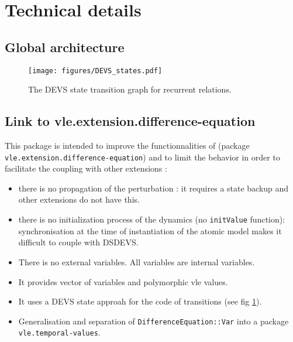 \documentclass{article}
\theoremstyle{remark}
\begin{document}
\section{Technical details}

\subsection{Global architecture}
\label{sec:archi}

\begin{figure}[!h]
\begin{center} 
\texttt{[image: figures/DEVS\_states.pdf]}
\caption{\label{fig:DEVSgraph} The DEVS state transition graph 
for recurrent relations.}
\end{center}
\end{figure}

\subsection{Link to vle.extension.difference-equation}

This package is intended to improve the functionnalities of (package \\
{\tt vle.extension.difference-equation}) and to limit the behavior 
in order to facilitate the coupling with other extensions :
\begin{itemize}
  \item there is no propagation of the perturbation : 
  it requires a state backup and other extensions do not have this.
  \item there is no initialization process of the dynamics (no {\tt initValue}
  function): synchronisation at the time of instantiation of the atomic model
  makes it difficult to couple with DSDEVS. 
  \item There is no external variables. All variables are internal variables. 
  \item It provides vector of variables and polymorphic vle values.
  \item It uses a DEVS state approah for the code of transitions 
  (see fig \ref{fig:DEVSgraph}).
  \item Generalisation and separation of \texttt{DifferenceEquation::Var} 
  into a package \texttt{vle.temporal-values}.
\end{itemize}
\end{document}
